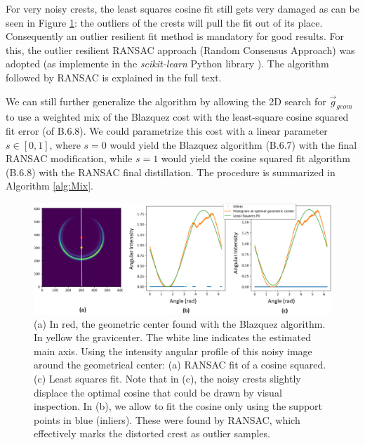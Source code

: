 \documentclass[11pt, a4paper, twoside]{article} %
\begin{document}
For very noisy crests, the least squares cosine fit still gets very damaged as can be seen in Figure \ref{fig:ransac}: the outliers of the crests will pull the fit out of its place. Consequently an outlier resilient fit method is mandatory for good results. For this, the outlier resilient RANSAC approach (Random Consensus Approach) \cite{RANSAC} was adopted (as implemente in the {\em scikit-learn} Python library \cite{sklearn}). The algorithm followed by RANSAC is explained in the full text.\vspace{-0.07cm}


We can still further generalize the algorithm by allowing the 2D search for $\vec{g}_{geom}$ to use a weighted mix of the Blazquez cost with the least-square cosine squared fit error (of B.6.8). We could parametrize this cost with a linear parameter $s\in[0,1]$, where $s=0$ would yield the Blazquez algorithm (B.6.7) with the final RANSAC modification, while $s=1$ would yield the cosine squared fit algorithm (B.6.8) with the RANSAC final distillation. The procedure is summarized in Algorithm \ref{alg:Mix}.\vspace{-0.1cm}

\begin{figure}[h!] 
     \centering 
    \includegraphics[width=0.84\linewidth]{histo.PNG}
    \caption{ (a) In red, the geometric center found with the Blazquez algorithm. In yellow the gravicenter. The white line indicates the estimated main axis. Using the intensity angular profile of this noisy image around the geometrical center: (a) RANSAC fit of a cosine squared. (c) Least squares fit. Note that in (c), the noisy crests slightly displace the optimal cosine that could be drawn by visual inspection. In (b), we allow to fit the cosine only using the support points in blue (inliers). These were found by RANSAC, which effectively marks the distorted crest as outlier samples.}\vspace{-0.3cm}
    \label{fig:ransac}
\end{figure}
\end{document}
